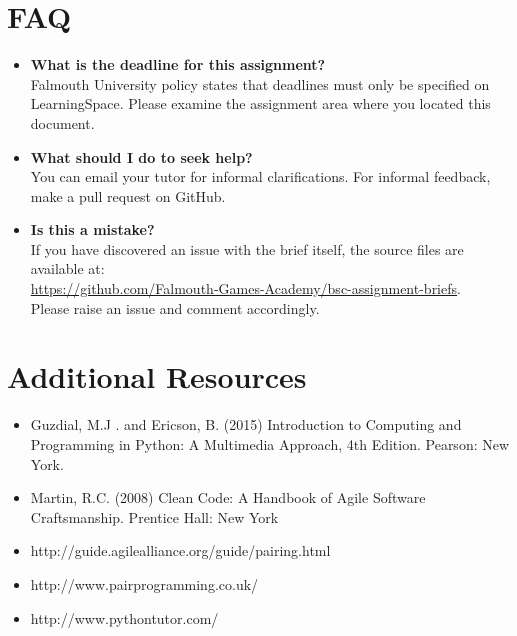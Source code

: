 \documentclass{fal_assignment}
\begin{document}
\section*{FAQ}

\begin{itemize}
	\item 	\textbf{What is the deadline for this assignment?} \\ 
    		Falmouth University policy states that deadlines must only be specified on LearningSpace. Please examine the assignment area where you located this document.
    		
	\item 	\textbf{What should I do to seek help?} \\ 
    		You can email your tutor for informal clarifications. For informal feedback, make a pull request on GitHub. 
    		
    	\item 	\textbf{Is this a mistake?} \\ 	
    		If you have discovered an issue with the brief itself, the source files are available at: \\
    		\url{https://github.com/Falmouth-Games-Academy/bsc-assignment-briefs}.\\
    		 Please raise an issue and comment accordingly.
\end{itemize}

\section*{Additional Resources}

\begin{itemize}
    \item Guzdial, M.J . and Ericson, B. (2015) Introduction to Computing and Programming in Python: A Multimedia Approach, 4th Edition. Pearson: New York.
    \item Martin, R.C. (2008) Clean Code: A Handbook of Agile Software Craftsmanship. Prentice Hall: New York
    \item http://guide.agilealliance.org/guide/pairing.html
    \item http://www.pairprogramming.co.uk/
    \item http://www.pythontutor.com/
\end{itemize}
\end{document}

